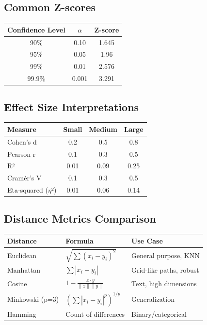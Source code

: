 \documentclass[11pt]{article}
\begin{document}
\subsection{Common Z-scores}

\begin{center}
\begin{tabular}{|c|c|c|}
\hline
\textbf{Confidence Level} & \textbf{$\alpha$} & \textbf{Z-score} \\
\hline
90\% & 0.10 & 1.645 \\
95\% & 0.05 & 1.96 \\
99\% & 0.01 & 2.576 \\
99.9\% & 0.001 & 3.291 \\
\hline
\end{tabular}
\end{center}

\subsection{Effect Size Interpretations}

\begin{center}
\small
\begin{tabular}{|l|c|c|c|}
\hline
\textbf{Measure} & \textbf{Small} & \textbf{Medium} & \textbf{Large} \\
\hline
Cohen's d & 0.2 & 0.5 & 0.8 \\
Pearson r & 0.1 & 0.3 & 0.5 \\
R² & 0.01 & 0.09 & 0.25 \\
Cramér's V & 0.1 & 0.3 & 0.5 \\
Eta-squared ($\eta$²) & 0.01 & 0.06 & 0.14 \\
\hline
\end{tabular}
\end{center}

\subsection{Distance Metrics Comparison}

\begin{center}
\small
\begin{tabular}{|l|p{6cm}|p{5cm}|}
\hline
\textbf{Distance} & \textbf{Formula} & \textbf{Use Case} \\
\hline
Euclidean & $\sqrt{\sum(x_{i} - y_{i})^2}$ & General purpose, KNN \\
Manhattan & $\sum|x_{i} - y_{i}|$ & Grid-like paths, robust \\
Cosine & $1 - \frac{x \cdot y}{\|x\|\|y\|}$ & Text, high dimensions \\
Minkowski (p=3) & $(\sum|x_{i} - y_{i}|^p)^{1/p}$ & Generalization \\
Hamming & Count of differences & Binary/categorical \\
\hline
\end{tabular}
\end{center}
\end{document}
